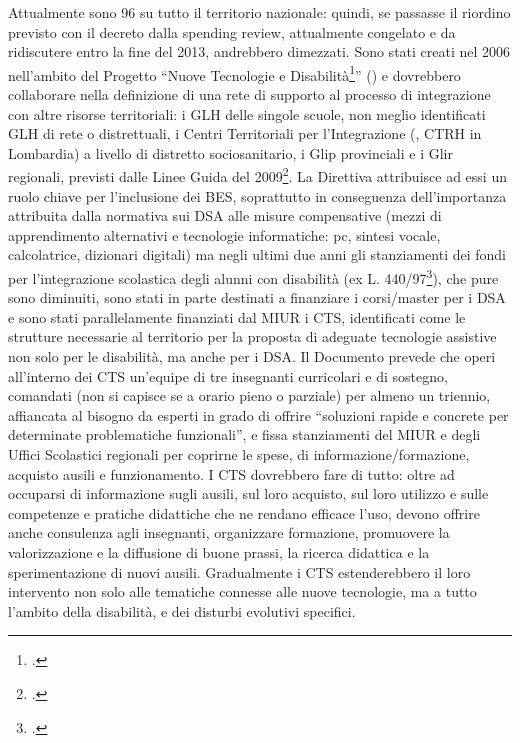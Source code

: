 Attualmente sono 96 su tutto il territorio nazionale: quindi, se passasse il riordino previsto con il
decreto dalla spending review, attualmente congelato e da ridiscutere entro la fine del 2013,
andrebbero dimezzati. Sono stati creati nel 2006 nell'ambito del Progetto “Nuove Tecnologie e
Disabilità\footcite{MIUR2006}” () e dovrebbero collaborare nella definizione di una rete di supporto al processo
di integrazione con altre risorse territoriali: i GLH delle singole scuole, non meglio identificati GLH
di rete o distrettuali, i Centri Territoriali per l'Integrazione (, CTRH in Lombardia) a livello di
distretto sociosanitario, i Glip provinciali e i Glir regionali, previsti dalle Linee Guida del 2009\footcite{LineGuida2009}.
La Direttiva attribuisce ad essi un ruolo chiave per l'inclusione dei BES, soprattutto in
conseguenza dell'importanza attribuita dalla normativa sui DSA alle misure compensative (mezzi
di apprendimento alternativi e tecnologie informatiche: pc, sintesi vocale, calcolatrice, dizionari
digitali) ma negli ultimi due anni gli stanziamenti dei fondi per l'integrazione scolastica degli
alunni con disabilità (ex L. 440/97\footcite{Legge_440_97}), che pure sono diminuiti, sono stati in parte destinati a
finanziare i corsi/master per i DSA e sono stati parallelamente finanziati dal MIUR i CTS,
identificati come le strutture necessarie al territorio per la proposta di adeguate tecnologie
assistive non solo per le disabilità, ma anche per i DSA.
Il Documento prevede che operi all'interno dei CTS un'equipe di tre insegnanti curricolari e di
sostegno, comandati (non si capisce se a orario pieno o parziale) per almeno un triennio,
affiancata al bisogno da esperti in grado di offrire “soluzioni rapide e concrete per determinate
problematiche funzionali”, e fissa stanziamenti del MIUR e degli Uffici Scolastici regionali per
coprirne le spese, di informazione/formazione, acquisto ausili e funzionamento.
I CTS dovrebbero fare di tutto: oltre ad occuparsi di informazione sugli ausili, sul loro acquisto,
sul loro utilizzo e sulle competenze e pratiche didattiche che ne rendano efficace l'uso, devono
offrire anche consulenza agli insegnanti, organizzare formazione, promuovere la valorizzazione e
la diffusione di buone prassi, la ricerca didattica e la sperimentazione di nuovi ausili.
Gradualmente i CTS estenderebbero il loro intervento non solo alle tematiche connesse alle
nuove tecnologie, ma a tutto l'ambito della disabilità, e dei disturbi evolutivi specifici.
